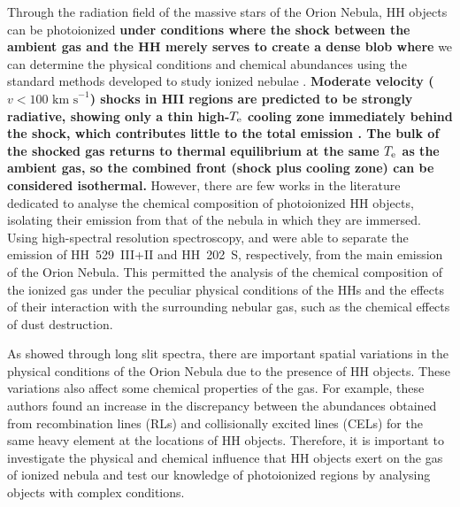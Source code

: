 \documentclass[fleqn,usenatbib]{mnras}
\begin{document}
Through the radiation field of the massive stars of the Orion Nebula, HH objects can be photoionized {\bf under conditions where the shock between the ambient gas and the HH merely serves to create a dense blob where} we can determine the physical conditions and chemical abundances using the standard methods developed to study ionized nebulae \citep{Reipurth01}. {\bf Moderate velocity ($v<100 \text{ km s}^{-1}$) shocks in H\thinspace II regions are predicted to be strongly radiative, showing only a thin high-$T_{\rm e}$ cooling zone immediately behind the shock, which contributes little to the total emission \citep{henney02}. The bulk of the shocked gas returns to thermal equilibrium at the same $T_{\rm e}$ as the ambient gas, so the combined front (shock plus cooling zone) can be considered isothermal.} However, there are few works in the literature dedicated to analyse the chemical composition of photoionized HH objects, isolating their emission from that of the nebula in which they are immersed. Using high-spectral resolution spectroscopy, \citet{Blagrave06} and \citet{mesadelgado09} were able to separate the emission of HH~529~III+II and HH~202~S, respectively, from the main emission of the Orion Nebula. This permitted the analysis of the chemical composition of the ionized gas under the peculiar physical conditions of the HHs and the effects  of their interaction with the surrounding nebular gas, such as the chemical effects of dust destruction. 

As \citet{mesadelgado08} showed through long slit spectra, there are important spatial variations in the physical conditions of the Orion Nebula due to the presence of HH objects. These variations also affect some chemical properties of the gas. For example, these authors found an increase in the discrepancy between the abundances obtained from recombination lines (RLs) and collisionally excited lines (CELs) for the same heavy element at the locations of HH objects. Therefore, it is important to investigate the physical and chemical influence that HH objects exert on the gas of ionized nebula and test our knowledge of photoionized regions by analysing objects with complex conditions.
\end{document}
